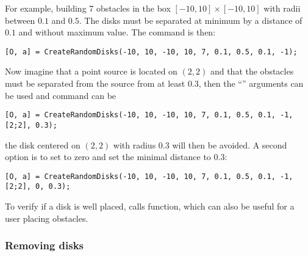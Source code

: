 For example, building 7 obstacles in the box $[-10,10]\times[-10,10]$ with radii between $0.1$ and $0.5$. The disks must be separated at minimum by a distance of $0.1$ and without maximum value. The command is then:
\begin{verbatim}
[O, a] = CreateRandomDisks(-10, 10, -10, 10, 7, 0.1, 0.5, 0.1, -1);
\end{verbatim}
Now imagine that a point source is located on $(2,2)$ and that the obstacles must be separated from the source from at least $0.3$, then the ``'' arguments can be used and command can be
\begin{verbatim}
[O, a] = CreateRandomDisks(-10, 10, -10, 10, 7, 0.1, 0.5, 0.1, -1, [2;2], 0.3);
\end{verbatim}
the disk centered on $(2,2)$ with radius $0.3$ will then be avoided. A second option is to set  to zero and set the minimal distance  to $0.3$:
\begin{verbatim}
[O, a] = CreateRandomDisks(-10, 10, -10, 10, 7, 0.1, 0.5, 0.1, -1, [2;2], 0, 0.3);
\end{verbatim}


\begin{remark}
To verify if a disk is well placed,  calls  function, which can also be useful for a user placing obstacles.
\end{remark}

\subsubsection{Removing disks}

